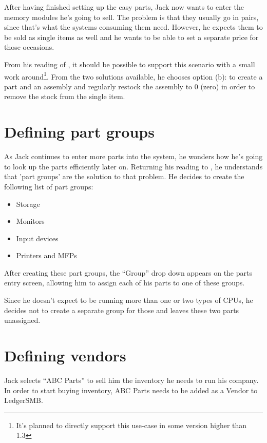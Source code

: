 After having finished setting up the easy parts, Jack now wants to enter
the memory modules he's going to sell. The problem is that they usually go in pairs,
since that's what the systems consuming them need. However, he expects them to be sold
as single items as well and he wants to be able to set a separate price for those occasions.

From his reading of , it should be
possible to support this scenario with a small work around\footnote{It's planned to directly
support this use-case in some version higher than 1.3}. From the two solutions available,
he chooses option (b): to create a part and an assembly and regularly restock the assembly
to 0 (zero) in order to remove the stock from the single item.

\section{Defining part groups}

As Jack continues to enter more parts into the system, he wonders how he's going to
look up the parts efficiently later on. Returning his reading to ,
he understands that 'part groups' are the solution to that problem. He decides to create
the following list of part groups:

\begin{itemize}
\item Storage
\item Monitors
\item Input devices
\item Printers and MFPs
\end{itemize}

After creating these part groups, the ``Group'' drop down appears on the parts entry screen,
allowing him to assign each of his parts to one of these groups.

Since he doesn't expect to be running more than one or two types of CPUs, he decides
not to create a separate group for those and leaves these two parts unassigned.

\section{Defining vendors}
\label{sec:defining-vendors}

Jack selects ``ABC Parts'' to sell him the inventory he needs to run his company. In
order to start buying inventory, ABC Parts needs to be added as a Vendor to LedgerSMB.

